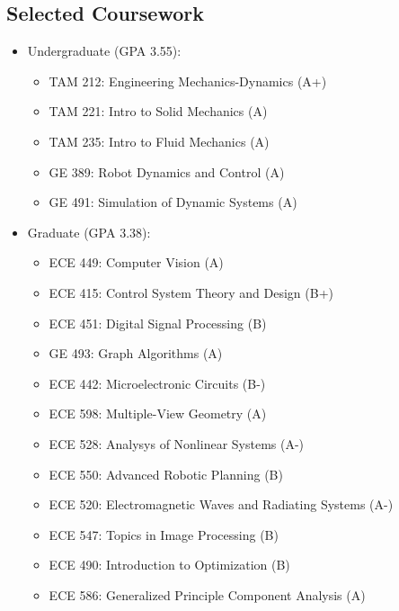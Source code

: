 \documentclass[line]{res}
\def\spaceline{\vspace{1mm} \fullline}
\begin{document}
\begin{resume}
	\section{Selected Coursework}

	\begin{itemize} 
\item 
	\spaceline
Undergraduate (GPA 3.55):
	\begin{itemize}
	\item TAM 212: Engineering Mechanics-Dynamics (A+)
	\item TAM 221: Intro to Solid Mechanics (A)
	\item TAM 235: Intro to Fluid Mechanics (A)
	\item GE 389: Robot Dynamics and Control (A)
	\item GE 491: Simulation of Dynamic Systems (A)
\end{itemize}
	\item Graduate (GPA 3.38):
\begin{itemize}
\item ECE 449: Computer Vision (A)	
\item ECE 415: Control System Theory and Design (B+)

\item ECE 451: Digital Signal Processing (B)
\item GE 493: Graph Algorithms (A)


\item ECE 442: Microelectronic Circuits (B-)
\item ECE 598: Multiple-View Geometry (A)

\item ECE 528: Analysys of Nonlinear Systems (A-)
\item ECE 550: Advanced Robotic Planning (B)

\item ECE 520: Electromagnetic Waves and Radiating Systems (A-)
\item ECE 547: Topics in Image Processing (B)

\item ECE 490: Introduction to Optimization (B)
\item ECE 586: Generalized Principle Component Analysis (A)


\end{itemize}
\end{itemize}
\end{resume}
\end{document}
